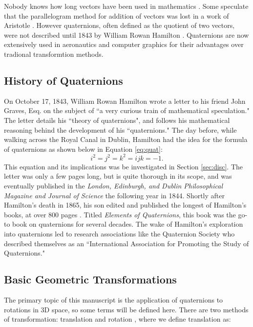 Nobody knows how long vectors have been used in mathematics \cite{history}.
Some speculate that the parallelogram method for addition of vectors was lost in a work of Aristotle \cite{history}.
However quaternions, often defined as the quotient of two vectors, were not described until 1843 by William Rowan Hamilton \cite{manual}.
Quaternions are now extensively used in aeronautics and computer graphics for their advantages over tradional transformtion methods.


\subsection{History of Quaternions}

On October 17, 1843, William Rowan Hamilton wrote a letter to his friend John Graves, Esq. on the subject of ``a very curious train of mathematical speculation."
The letter details his ``theory of quaternions", and follows his mathematical reasoning behind the development of his ``quaternions."
The day before, while walking across the Royal Canal in Dublin, Hamilton had the idea for the formula of quaternions as shown below in Equation \ref{eq:quat}: \cite{manual}
\begin{equation}
\label{eq:quat}
i^2 = j^2 = k^2 = ijk = -1.
\end{equation}
This equation and its implications was be investigated in Section \ref{sec:disc}.
The letter was only a few pages long, but is quite thorough in its scope, and was eventually published in the \textit{London, Edinburgh, and Dublin Philosophical Magazine and Journal of Science} the following year in 1844. \cite{letter}
Shortly after Hamilton's death in 1865, his son edited and published the longest of Hamilton's books, at over 800 pages \cite{elements}. 
Titled \textit{Elements of Quaternions}, this book was the go-to book on quaternions for several decades.
The wake of Hamilton's exploration into quaternions led to research associations like the Quaternion Society who described themselves as an ``International Association for Promoting the Study of Quaternions."

\subsection{Basic Geometric Transformations}
\label{sub:geo}

The primary topic of this manuscript is the application of quaternions to rotations in 3D space, so some terms will be defined here.
There are two methods of transformation: translation and rotation \cite{animation}, where we define translation as:

